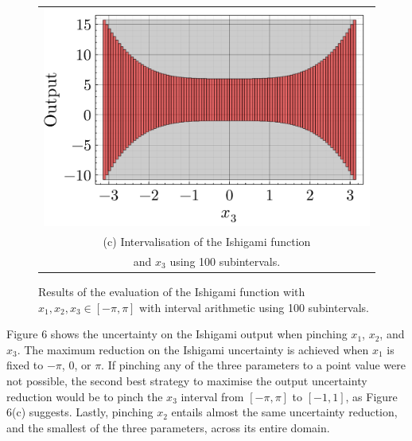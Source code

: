 \documentclass[twocolumn]{rps-esrel2022}
\begin{document}
\begin{figure}[!t]
	\begin{tabular}{@{}c@{}}
		\includegraphics[width=0.94\linewidth]{figures/ishigami_3.pdf} \\
		\small (c) Intervalisation of the Ishigami function\\
		\small and $x_3$ using 100 subintervals.
	  \end{tabular}

	\caption{Results of the evaluation of the Ishigami function with $x_1,x_2,x_3 \in [-\pi,\pi]$ with interval arithmetic using 100 subintervals.
	}
\end{figure}

Figure 6 shows the uncertainty on the Ishigami output when pinching $x_1$, $x_2$, and $x_3$.
The maximum reduction on the Ishigami uncertainty is achieved when $x_1$ is fixed to $-\pi$, $0$, or $\pi$.
If pinching any of the three parameters to a point value were not possible, the second best strategy to maximise the output uncertainty
reduction would be to pinch the $x_3$ interval from $[-\pi,\pi]$ to $[-1,1]$, as Figure 6(c) suggests.
Lastly, pinching $x_2$ entails almost the same uncertainty reduction, and the smallest of the three parameters, across its entire domain.
\end{document}
